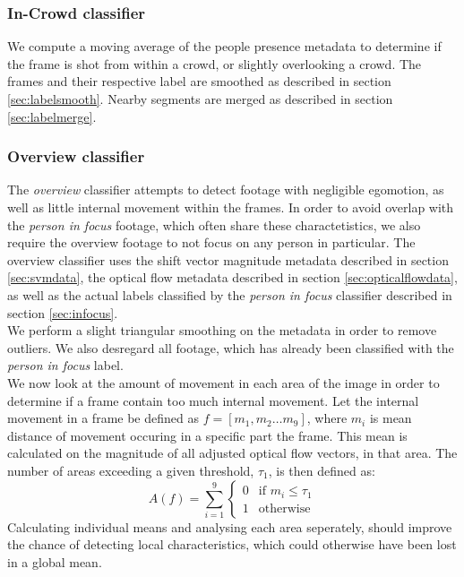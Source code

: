 \subsubsection{In-Crowd classifier}\label{sec:incrowd}
%
We compute a moving average of the people presence metadata to determine if the frame is shot from within a crowd, or slightly overlooking a crowd. The frames and their respective label are smoothed as described in section \ref{sec:labelsmooth}. Nearby segments are merged as described in section \ref{sec:labelmerge}.
%
\subsubsection{Overview classifier}\label{sec:overviewclassifier}
%
The \textit{overview} classifier attempts to detect footage with negligible egomotion, as well as little internal movement within the frames. In order to avoid overlap with the \textit{person in focus} footage, which often share these charactetistics, we also require the overview footage to not focus on any person in particular. The overview classifier uses the shift vector magnitude metadata described in section \ref{sec:svmdata}, the optical flow metadata described in section \ref{sec:opticalflowdata}, as well as the actual labels classified by the \textit{person in focus} classifier described in section \ref{sec:infocus}.\\
We perform a slight triangular smoothing on the metadata in order to remove outliers. We also desregard all footage, which has already been classified with the \textit{person in focus} label.\\
We now look at the amount of movement in each area of the image in order to determine if a frame contain too much internal movement. Let the internal movement in a frame be defined as $f = [m_{1},m_{2} \dots m_{9}]$, where $m_{i}$ is mean distance of movement occuring in a specific part the frame. This mean is calculated on the magnitude of all adjusted optical flow vectors, in that area. The number of areas exceeding a given threshold, $\tau_{1}$, is then defined as:
%
\begin{equation}
A(f) = \sum_{i=1}^{9}
\begin{cases}
0 & \text{if } m_{i} \leq \tau_{1}\\
1 &  \text{otherwise}
\end{cases}
\end{equation}
%
Calculating individual means and analysing each area seperately, should improve the chance of detecting local characteristics, which could otherwise have been lost in a global mean.\\
